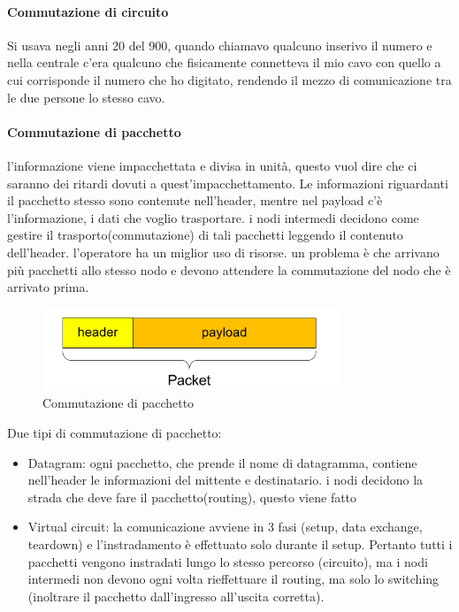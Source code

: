 \paragraph{Commutazione di circuito}
Si usava negli anni 20 del 900, quando chiamavo qualcuno inserivo il numero e nella centrale c’era qualcuno che fisicamente connetteva il mio cavo con quello a cui corrisponde il numero che ho digitato, rendendo il mezzo di comunicazione tra le due persone lo stesso cavo.
\paragraph{Commutazione di pacchetto} 
l'informazione viene impacchettata e divisa in unità, questo vuol dire che ci saranno dei ritardi dovuti a quest'impacchettamento. Le informazioni riguardanti il pacchetto stesso sono contenute nell'header, mentre nel payload c'è l'informazione, i dati che voglio trasportare. 
i nodi intermedi decidono come gestire il trasporto(commutazione) di tali pacchetti leggendo il contenuto dell’header. l’operatore ha un miglior uso di risorse.
un problema è che arrivano più pacchetti allo stesso nodo e devono attendere la commutazione del nodo che è arrivato prima.

\begin{figure}[h!]
    \centering
    \includegraphics[width=0.8\textwidth]{images/pacchetto_generico.png}
    \caption{Commutazione di pacchetto}
    \label{fig:commutazione_pacchetto}
\end{figure}

Due tipi di commutazione di pacchetto: 
\begin{itemize}
    \item Datagram: ogni pacchetto, che prende il nome di datagramma, contiene nell’header le informazioni del mittente e destinatario. i nodi decidono la strada che deve fare il pacchetto(routing), questo viene fatto
    \item Virtual circuit: la comunicazione avviene in 3 fasi (setup, data
exchange, teardown) e l'instradamento è effettuato solo durante il setup.
Pertanto tutti i pacchetti vengono instradati lungo lo stesso percorso
(circuito), ma i nodi intermedi non devono ogni volta rieffettuare il routing,
ma solo lo switching (inoltrare il pacchetto dall'ingresso all'uscita corretta).
\end{itemize}
\newpage
